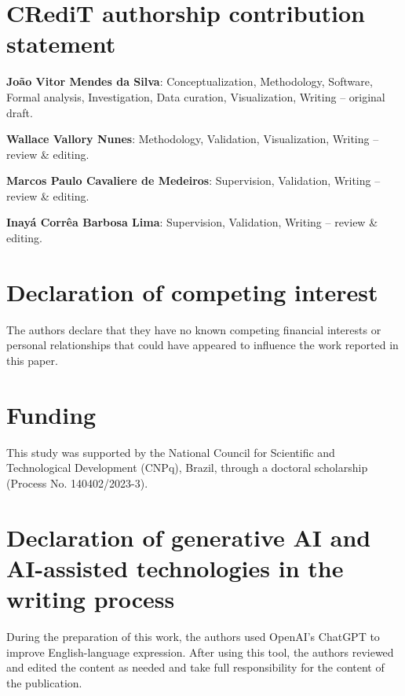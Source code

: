 \documentclass[12pt]{elsarticle}
\begin{document}
\section*{CRediT authorship contribution statement}
	
	\textbf{Jo\~ao Vitor Mendes da Silva}: Conceptualization, Methodology,
	Software, Formal analysis, Investigation, Data curation, Visualization,
	Writing -- original draft.
	
	\textbf{Wallace Vallory Nunes}: Methodology, Validation, Visualization,
	Writing -- review \& editing.
	
	\textbf{Marcos Paulo Cavaliere de Medeiros}: Supervision, Validation,
	Writing -- review \& editing.
	
	\textbf{Inay\'a Corr\^ea Barbosa Lima}: Supervision, Validation,
	Writing -- review \& editing.
		
	\section*{Declaration of competing interest}
	The authors declare that they have no known competing financial interests or personal relationships that could have appeared to influence the work reported in this paper.

	\section*{Funding}
	This study was supported by the National Council for Scientific and Technological Development (CNPq), Brazil, through a doctoral scholarship (Process No. 140402/2023-3).
	
	\section*{Declaration of generative AI and AI-assisted technologies in the writing process}
	During the preparation of this work, the authors used OpenAI's ChatGPT to improve English-language expression. After using this tool, the authors reviewed and edited the content as needed and take full responsibility for the content of the publication.
	
	
	
	
\end{document}
